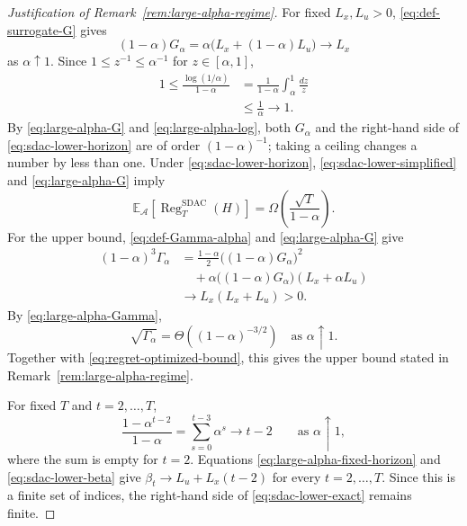 \documentclass[journal]{IEEEtran}
\theoremstyle{remark}
\newcommand{\RegSDAC}[1]{\operatorname{Reg}_{#1}^{\mathrm{SDAC}}}
\begin{document}
\begin{proof}[Justification of Remark~\ref{rem:large-alpha-regime}]
For fixed $L_x,L_u>0$, \eqref{eq:def-surrogate-G} gives
\begin{equation}
\label{eq:large-alpha-G}
(1-\alpha)G_\alpha
=\alpha\bigl(L_x+(1-\alpha)L_u\bigr)
\longrightarrow L_x
\end{equation}
as $\alpha\uparrow1$. Since $1\le z^{-1}\le\alpha^{-1}$ for
$z\in[\alpha,1]$,
\begin{equation}
\label{eq:large-alpha-log}
\begin{aligned}
1\le\frac{\log(1/\alpha)}{1-\alpha}
&=\frac{1}{1-\alpha}\int_\alpha^1\frac{dz}{z}\\
&\le\frac{1}{\alpha}\longrightarrow1.
\end{aligned}
\end{equation}
By \eqref{eq:large-alpha-G} and \eqref{eq:large-alpha-log}, both
$G_\alpha$ and the right-hand side of \eqref{eq:sdac-lower-horizon}
are of order $(1-\alpha)^{-1}$; taking a ceiling changes a number by
less than one. Under \eqref{eq:sdac-lower-horizon},
\eqref{eq:sdac-lower-simplified} and \eqref{eq:large-alpha-G} imply
\begin{equation}
\label{eq:large-alpha-lower}
\mathbb{E}_{\mathcal{A}}\!\left[\RegSDAC{T}(H)\right]
=
\Omega\!\left(\frac{\sqrt{T}}{1-\alpha}\right).
\end{equation}
For the upper bound, \eqref{eq:def-Gamma-alpha} and
\eqref{eq:large-alpha-G} give
\begin{equation}
\label{eq:large-alpha-Gamma}
\begin{aligned}
(1-\alpha)^3\Gamma_\alpha
&=\frac{1-\alpha}{2}\bigl((1-\alpha)G_\alpha\bigr)^2 \\
&\quad+\alpha\bigl((1-\alpha)G_\alpha\bigr)
(L_x+\alpha L_u) \\
&\longrightarrow L_x(L_x+L_u)>0.
\end{aligned}
\end{equation}
By \eqref{eq:large-alpha-Gamma},
\begin{equation}
\label{eq:large-alpha-upper}
\sqrt{\Gamma_\alpha}
=\Theta\!\left((1-\alpha)^{-3/2}\right)
\quad\text{as }\alpha\uparrow1.
\end{equation}
Together with \eqref{eq:regret-optimized-bound}, this gives the upper
bound stated in Remark~\ref{rem:large-alpha-regime}.

For fixed $T$ and $t=2,\ldots,T$,
\begin{equation}
\label{eq:large-alpha-fixed-horizon}
\frac{1-\alpha^{t-2}}{1-\alpha}
=\sum_{s=0}^{t-3}\alpha^s\longrightarrow t-2
\qquad\text{as }\alpha\uparrow1,
\end{equation}
where the sum is empty for $t=2$. Equations
\eqref{eq:large-alpha-fixed-horizon} and \eqref{eq:sdac-lower-beta}
give $\beta_t\to L_u+L_x(t-2)$ for every $t=2,\ldots,T$.
Since this is a finite set of indices, the right-hand side of
\eqref{eq:sdac-lower-exact} remains finite.
\end{proof}



\end{document}
